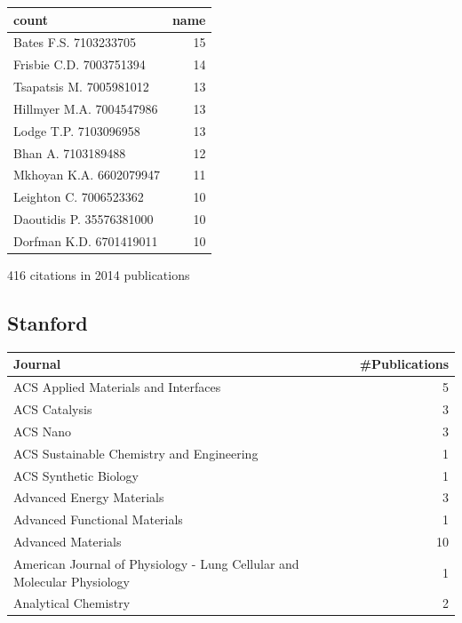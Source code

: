 \documentclass[11pt]{article}
\begin{document}
\begin{center}
\begin{tabular}{lr}
count & name\\
\hline
Bates F.S. 7103233705 & 15\\
Frisbie C.D. 7003751394 & 14\\
Tsapatsis M. 7005981012 & 13\\
Hillmyer M.A. 7004547986 & 13\\
Lodge T.P. 7103096958 & 13\\
Bhan A. 7103189488 & 12\\
Mkhoyan K.A. 6602079947 & 11\\
Leighton C. 7006523362 & 10\\
Daoutidis P. 35576381000 & 10\\
Dorfman K.D. 6701419011 & 10\\
\end{tabular}
\end{center}

416 citations in 2014 publications

\subsection{Stanford}
\label{sec-1-7}
\begin{center}
\begin{tabular}{lr}
Journal & \#Publications\\
\hline
ACS Applied Materials and Interfaces & 5\\
ACS Catalysis & 3\\
ACS Nano & 3\\
ACS Sustainable Chemistry and Engineering & 1\\
ACS Synthetic Biology & 1\\
Advanced Energy Materials & 3\\
Advanced Functional Materials & 1\\
Advanced Materials & 10\\
American Journal of Physiology - Lung Cellular and Molecular Physiology & 1\\
Analytical Chemistry & 2\\
\end{tabular}
\end{center}
\end{document}
